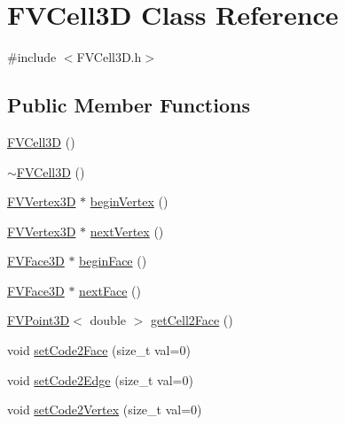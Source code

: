 \hypertarget{classFVCell3D}{
\section{FVCell3D Class Reference}
\label{d0/ded/classFVCell3D}
}


{\ttfamily \#include $<$FVCell3D.h$>$}

\subsection*{Public Member Functions}
\begin{DoxyCompactItemize}
\item 
\hyperlink{classFVCell3D_a49bd227b79650dd9cef19953d95b7cef}{FVCell3D} ()
\item 
\hyperlink{classFVCell3D_a889aa6d5cf332a937956788ce218389a}{$\sim$FVCell3D} ()
\item 
\hyperlink{classFVVertex3D}{FVVertex3D} $\ast$ \hyperlink{classFVCell3D_a00e03dd7e67cf78d0d00487e52394451}{beginVertex} ()
\item 
\hyperlink{classFVVertex3D}{FVVertex3D} $\ast$ \hyperlink{classFVCell3D_a936762a7544b61fc2a7bf156a3394d28}{nextVertex} ()
\item 
\hyperlink{classFVFace3D}{FVFace3D} $\ast$ \hyperlink{classFVCell3D_aa21193e45097be75beb98132a1586e58}{beginFace} ()
\item 
\hyperlink{classFVFace3D}{FVFace3D} $\ast$ \hyperlink{classFVCell3D_aa3011d7de736306ee0ab315acfcb73a7}{nextFace} ()
\item 
\hyperlink{classFVPoint3D}{FVPoint3D}$<$ double $>$ \hyperlink{classFVCell3D_afbdbd782a9de358a91b0875abb0b5220}{getCell2Face} ()
\item 
void \hyperlink{classFVCell3D_acbc323a04994b55b242f1023e6a29d1c}{setCode2Face} (size\_\-t val=0)
\item 
void \hyperlink{classFVCell3D_a9e25d24a18a62921eff34d38f8b1b896}{setCode2Edge} (size\_\-t val=0)
\item 
void \hyperlink{classFVCell3D_a0a47b3287cfccb79cba1552f3ad1e7b9}{setCode2Vertex} (size\_\-t val=0)
\end{DoxyCompactItemize}
